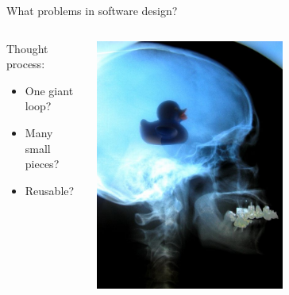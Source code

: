 \documentclass[aspectratio=43]{beamer}
\begin{document}
\begin{frame}{What problems in software design?}
\begin{columns}
	\begin{column}{0.55\textwidth}
Thought process:
		\begin{itemize}
			\item One giant loop?
                        \item Many small pieces?
                        \item Reusable? 
		\end{itemize} 
        \end{column} 
        \begin{column}{0.45\textwidth} 
          \centering 
          \includegraphics[width=0.6\textwidth]{fig/duckie-brain.jpg} 
        \end{column}
\end{columns}

\end{frame}
\end{document}
